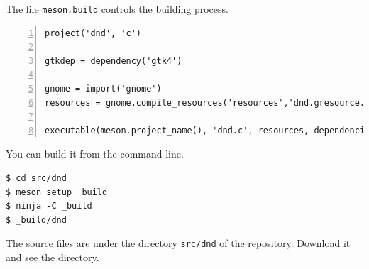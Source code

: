 The file \passthrough{\lstinline!meson.build!} controls the building
process.

\begin{lstlisting}[numbers=left]
project('dnd', 'c')

gtkdep = dependency('gtk4')

gnome = import('gnome')
resources = gnome.compile_resources('resources','dnd.gresource.xml')

executable(meson.project_name(), 'dnd.c', resources, dependencies: gtkdep, export_dynamic: true, install: false)
\end{lstlisting}

You can build it from the command line.

\begin{lstlisting}
$ cd src/dnd
$ meson setup _build
$ ninja -C _build
$ _build/dnd
\end{lstlisting}

The source files are under the directory
\passthrough{\lstinline!src/dnd!} of the
\href{https://github.com/ToshioCP/Gtk4-tutorial}{repository}. Download
it and see the directory.
